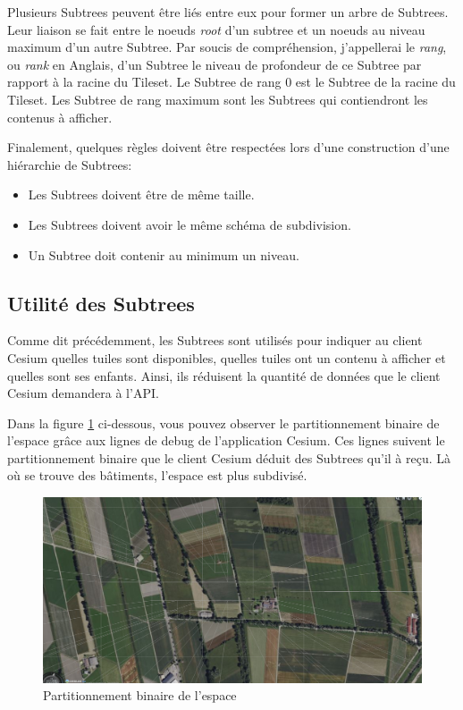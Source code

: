 Plusieurs Subtrees peuvent être liés entre eux pour former un arbre de Subtrees. Leur liaison se fait entre le noeuds \textit{root} d'un subtree et un noeuds au niveau maximum d'un autre Subtree. Par soucis de compréhension, j'appellerai le \textit{rang}, ou \textit{rank} en Anglais, d'un Subtree le niveau de profondeur de ce Subtree par rapport à la racine du Tileset. Le Subtree de rang 0 est le Subtree de la racine du Tileset. Les Subtree de rang maximum sont les Subtrees qui contiendront les contenus à afficher.

Finalement, quelques règles doivent être respectées lors d'une construction d'une hiérarchie de Subtrees:

\begin{itemize}
    \item Les Subtrees doivent être de même taille.
    \item Les Subtrees doivent avoir le même schéma de subdivision.
    \item Un Subtree doit contenir au minimum un niveau.
\end{itemize}

\newpage
\subsection*{Utilité des Subtrees}

Comme dit précédemment, les Subtrees sont utilisés pour indiquer au client Cesium quelles tuiles sont disponibles, quelles tuiles ont un contenu à afficher et quelles sont ses enfants. Ainsi, ils réduisent la quantité de données que le client Cesium demandera à l'API.

Dans la figure \ref{fig:subtree-debug} ci-dessous, vous pouvez observer le partitionnement binaire de l'espace grâce aux lignes de debug de l'application Cesium. Ces lignes suivent le partitionnement binaire que le client Cesium déduit des Subtrees qu'il à reçu. Là où se trouve des bâtiments, l'espace est plus subdivisé.

\begin{figure}[H]
    \centering
    \includegraphics[width=1\textwidth]{assets/figures/Subtree_debug.png}
    \caption{Partitionnement binaire de l'espace}
    \label{fig:subtree-debug}
\end{figure}

